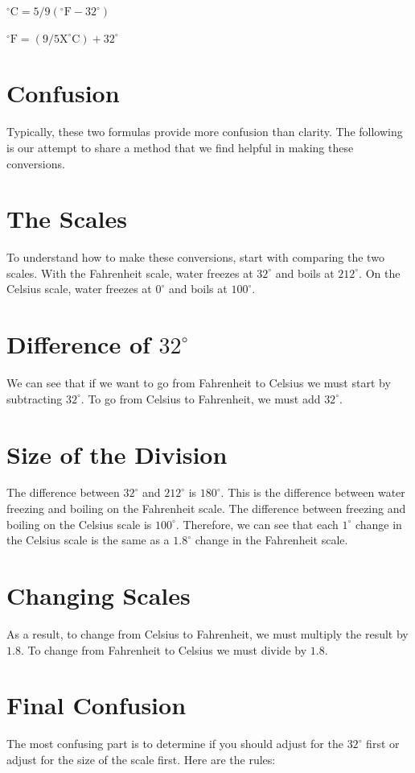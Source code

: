 \documentclass[10pt]{article}
\begin{document}
${ }^{\circ} \mathrm{C}=5 / 9\left({ }^{\circ} \mathrm{F}-32^{\circ}\right)$

${ }^{\circ} \mathrm{F}=\left(9 / 5 \mathrm{X}^{\circ} \mathrm{C}\right)+32^{\circ}$

\section{Confusion}
Typically, these two formulas provide more confusion than clarity. The following is our attempt to share a method that we find helpful in making these conversions.

\section{The Scales}
To understand how to make these conversions, start with comparing the two scales. With the Fahrenheit scale, water freezes at $32^{\circ}$ and boils at $212^{\circ}$. On the Celsius scale, water freezes at $0^{\circ}$ and boils at $100^{\circ}$.

\section{Difference of $32^{\circ}$}
We can see that if we want to go from Fahrenheit to Celsius we must start by subtracting $32^{\circ}$. To go from Celsius to Fahrenheit, we must add $32^{\circ}$.

\section{Size of the Division}
The difference between $32^{\circ}$ and $212^{\circ}$ is $180^{\circ}$. This is the difference between water freezing and boiling on the Fahrenheit scale. The difference between freezing and boiling on the Celsius scale is $100^{\circ}$. Therefore, we can see that each $1^{\circ}$ change in the Celsius scale is the same as a $1.8^{\circ}$ change in the Fahrenheit scale.

\section{Changing Scales}
As a result, to change from Celsius to Fahrenheit, we must multiply the result by $1.8$. To change from Fahrenheit to Celsius we must divide by $1.8$.

\section{Final Confusion}
The most confusing part is to determine if you should adjust for the $32^{\circ}$ first or adjust for the size of the scale first. Here are the rules:
\end{document}
